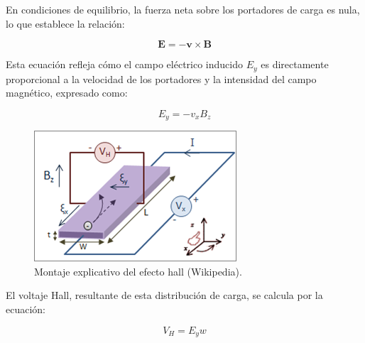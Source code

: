 	En condiciones de equilibrio, la fuerza neta sobre los portadores de carga es nula, lo que establece la relación:
	
	\vspace{\baselineskip}
	
	\begin{equation} \label{eq:equilibrio}
		\mathbf{E} = -\mathbf{v} \times \mathbf{B}
	\end{equation}
	
	\vspace{\baselineskip}
	
	Esta ecuación refleja cómo el campo eléctrico inducido \( E_y \) es directamente proporcional a la velocidad de los portadores y la intensidad del campo magnético, expresado como:
	
	
	\begin{equation} \label{eq:Ey}
		E_y = -v_x B_z
	\end{equation}
	
	 \begin{figure}[H]
	 	\centering
	 	\begin{minipage}{0.55\textwidth} 
	 		\includegraphics[width=\textwidth]{grafico_1_x00_Hall_Effect_Measurement_Setup_for_Electrons.png}
	 		\caption{Montaje explicativo del efecto hall (Wikipedia).}
	 		\label{fig:efecto_hall}
	 	\end{minipage}
	 \end{figure}
	
	El voltaje Hall, resultante de esta distribución de carga, se calcula por la ecuación:
	
	\vspace{\baselineskip}
	
	\begin{equation} \label{eq:voltaje_hall}
		V_H = E_y w
	\end{equation}
	
